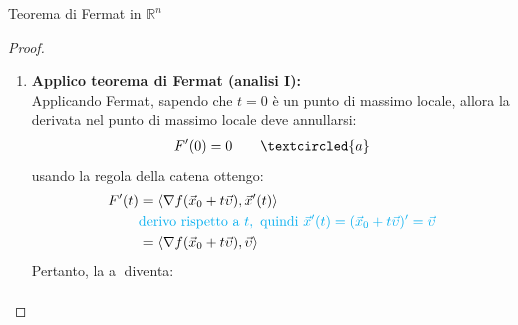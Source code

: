 \documentclass{article}  %
\begin{document}
\begin{theorem}{Teorema di Fermat in $\mathbb{R}^n$}
\begin{proof}
\begin{enumerate}
			      \begin{align*}
				      f(\vec{x}_0) \geq f(\vec{x}) \quad \quad \forall{\vec{x}_0} \in U
			      \end{align*}
			      e $t=0$ è un massimo locale per $f$, infatti
			      \begin{align*}
				      F(t)= f(\vec{x}_0+t \vec{\upsilon}) \quad \text{ con } t=0 \\ \implies F(0)= f(\vec{x}_0+0 \cdot \vec{\upsilon})= f(\vec{x}_0)
			      \end{align*}
			      Sapendo che
			      \begin{align*}
				      f(\vec{x}_0)      & \geq f(\vec{x})                                                             \\
				      \textcolor{cyan}{\text{e che } F(0)=f(\vec{x}_0) \text{ allora}}                                \\
				      F(0)=f(\vec{x}_0) & \geq f(\vec{x})=F(t)                                                        \\
				      \textcolor{cyan}{\text{ e sapendo che } \vec{x}(t)=f(\vec{x}_0+t\vec{\upsilon}) \text{ allora}} \\
				      F(0)=f(\vec{x}_0) & \geq f(\vec{x}_0+t\vec{\upsilon})=F(t)
			      \end{align*}
			      da qui si vede chiaramente perchè $t=0$ è un massimo locale per $F(t)$
			\item \textbf{Applico teorema di Fermat (analisi I):} \\
			      Applicando Fermat, sapendo che $t=0$ è un punto di massimo locale, allora la derivata nel punto di massimo locale deve annullarsi:
			      \begin{align*}
				      F'(0) = 0 \quad \quad \textcircled{a}
			      \end{align*}
			      usando la regola della catena ottengo:
			      \begin{align*}
				      F'(t) & = \langle \nabla f(\vec{x}_0+t \vec{\upsilon}), \vec{x}'(t) \rangle                                                        \\
				            & \textcolor{cyan}{\text{derivo rispetto a }t, \text{ quindi } \vec{x}'(t) = (\vec{x}_0+t \vec{\upsilon})' = \vec{\upsilon}} \\
				            & =  \langle \nabla f(\vec{x}_0+t \vec{\upsilon}), \vec{\upsilon} \rangle
			      \end{align*}
			      Pertanto, la \textcircled{a} diventa:
			      \begin{align*}

\end{align*}
\end{enumerate}
\end{proof}
\end{theorem}
\end{document}

